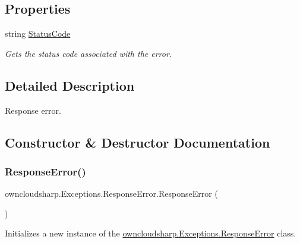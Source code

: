 \subsection*{Properties}
\begin{DoxyCompactItemize}
\item 
string \hyperlink{classowncloudsharp_1_1_exceptions_1_1_response_error_ab5291c58a78e4c72c2a7d1bf5f1a48c8}{Status\+Code}
\begin{DoxyCompactList}\small\item\em Gets the status code associated with the error. \end{DoxyCompactList}\end{DoxyCompactItemize}


\subsection{Detailed Description}
Response error. 



\subsection{Constructor \& Destructor Documentation}
\mbox{\label{classowncloudsharp_1_1_exceptions_1_1_response_error_adb1ae6b0d1d79b9bcbc9377972fcc6d3}} 
\subsubsection{\texorpdfstring{Response\+Error()}{ResponseError()}\hspace{0.1cm}{\footnotesize\ttfamily [1/3]}}
{\footnotesize\ttfamily owncloudsharp.\+Exceptions.\+Response\+Error.\+Response\+Error (\begin{DoxyParamCaption}{ }\end{DoxyParamCaption})}



Initializes a new instance of the \hyperlink{classowncloudsharp_1_1_exceptions_1_1_response_error}{owncloudsharp.\+Exceptions.\+Response\+Error} class. 


